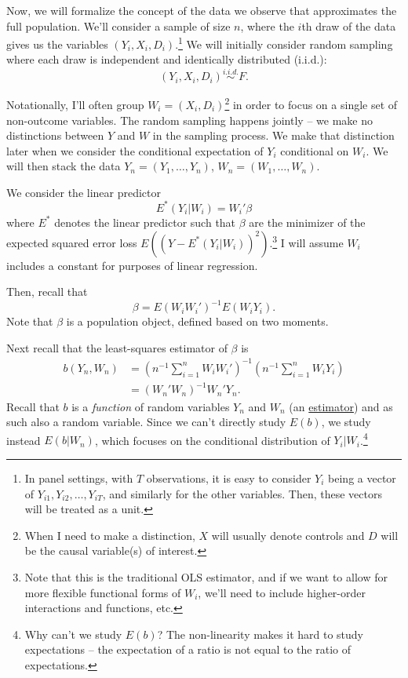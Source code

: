 \documentclass{tufte-handout}
\theoremstyle{break}
\begin{document}
Now, we will formalize the concept of the data we observe that approximates the full population. We'll consider a sample of size $n$, where the $i$th draw of the data gives us the variables $(Y_{i}, X_{i}, D_{i})$.\footnote{In panel settings, with $T$ observations, it is easy to consider $Y_{i}$ being a vector of $Y_{i1}, Y_{i2}, \ldots, Y_{iT}$, and similarly for the other variables. Then, these vectors will be treated as a unit.} We will initially consider random sampling where each draw is independent and identically distributed (i.i.d.):
\begin{equation}
  (Y_{i}, X_{i}, D_{i}) \overset{i.i.d.}{\sim} F.
\end{equation}

Notationally, I'll often group $W_{i} = (X_{i}, D_{i})$\footnote{When I need to make a distinction, $X$ will usually denote controls and $D$ will be the causal variable(s) of interest.} in order to focus on a single set of non-outcome variables. 
The random sampling happens jointly -- we make no distinctions between $Y$ and $W$ in the sampling process. We make that distinction later when we consider the conditional expectation of $Y_{i}$ conditional on $W_{i}$. We will then stack the data $Y_{n} = (Y_{1}, \ldots, Y_{n})$, $W_{n} = (W_{1}, \ldots, W_{n})$. 

We consider the linear predictor
\begin{equation*}
E^{*}(Y_{i}|  W_{i}) = W_{i}'\beta 
\end{equation*}
where $E^{*}$ denotes the linear predictor such that $\beta$ are the minimizer of the expected squared error loss $E((Y- E^{*}(Y_{i}|  W_{i}))^{2})$.\footnote{Note that this is the traditional OLS estimator, and if we want to allow for more flexible functional forms of $W_{i}$, we'll need to include higher-order interactions and functions, etc. } I will assume $W_{i}$ includes a constant for purposes of linear regression. 

Then, recall that
\begin{equation*}
  \beta = E(W_{i}W_{i}')^{-1}E(W_{i}Y_{i}).
\end{equation*}
Note that $\beta$ is a population object, defined based on two moments.

Next recall that the least-squares estimator of $\beta$ is
\begin{align}
  b(Y_{n}, W_{n}) &= \left(n^{-1}\sum_{i=1}^{n}W_{i}W_{i}'\right)^{-1}\left(n^{-1}\sum_{i=1}^{n}W_{i}Y_{i}\right)\\
  &= (W_{n}'W_{n})^{-1}W_{n}'Y_{n}.
\end{align}
Recall that $b$ is a \emph{function} of random variables $Y_{n}$ and $W_{n}$ (an \underline{estimator}) and as such also a random variable. Since we can't directly study $E(b)$, we study instead $E(b | W_{n})$, which focuses on the conditional distribution of $Y_{i} | W_{i}$.\footnote{Why can't we study $E(b)$? The non-linearity makes it hard to study expectations -- the expectation of a ratio is not equal to the ratio of expectations.}
\end{document}
